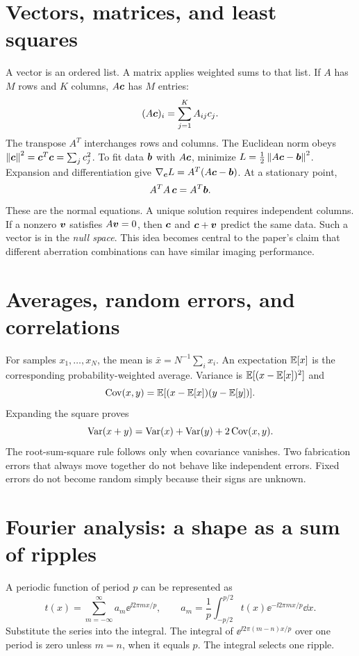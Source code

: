 \section{Vectors, matrices, and least squares}
A vector is an ordered list. A matrix applies weighted sums to that list.
If $A$ has $M$ rows and $K$ columns, $A\bm{c}$ has $M$ entries:
\[
(A\bm{c})_i=\sum_{j=1}^K A_{ij}c_j.
\]
The transpose $A^T$ interchanges rows and columns. The Euclidean norm
obeys $\left\lVert\bm{c}\right\rVert^2=\bm{c}^T\bm{c}=\sum_jc_j^2$.
To fit data $\bm{b}$ with $A\bm{c}$, minimize
$L=\tfrac12\left\lVert A\bm{c}-\bm{b}\right\rVert^2$.
Expansion and differentiation give
$\nabla_{\bm{c}}L=A^T(A\bm{c}-\bm{b})$.
At a stationary point,
\begin{equation}
A^TA\,\bm{c}=A^T\bm{b}.
\label{eq:normal}
\end{equation}
These are the normal equations. A unique solution requires independent
columns. If a nonzero $\bm{v}$ satisfies $A\bm{v}=0$, then $\bm{c}$
and $\bm{c}+\bm{v}$ predict the same data. Such a vector is in the
\emph{null space}. This idea becomes central to the paper's claim that
different aberration combinations can have similar imaging performance.

\section{Averages, random errors, and correlations}
For samples $x_1,\ldots,x_N$, the mean is $\bar x=N^{-1}\sum_i x_i$.
An expectation $\mathbb{E}[x]$ is the corresponding probability-weighted average.
Variance is $\mathbb{E}[(x-\mathbb{E}[x])^2]$ and
\[
\operatorname{Cov}(x,y)=\mathbb{E}[(x-\mathbb{E}[x])(y-\mathbb{E}[y])].
\]
Expanding the square proves
\begin{equation}
\operatorname{Var}(x+y)=\operatorname{Var}(x)+\operatorname{Var}(y)+2\operatorname{Cov}(x,y).
\label{eq:covsum}
\end{equation}
The root-sum-square rule follows only when covariance vanishes.
Two fabrication errors that always move together do not behave like
independent errors. Fixed errors do not become random simply because
their signs are unknown.

\section{Fourier analysis: a shape as a sum of ripples}
A periodic function of period $p$ can be represented as
\begin{equation}
t(x)=\sum_{m=-\infty}^{\infty}a_m\ee^{\ii2\pi mx/p},\qquad
a_m=\frac1p\int_{-p/2}^{p/2}t(x)\ee^{-\ii2\pi mx/p}\dd x.
\label{eq:fourierseries}
\end{equation}
Substitute the series into the integral. The integral of
$\ee^{\ii2\pi(m-n)x/p}$ over one period is zero unless $m=n$, when it
equals $p$. The integral selects one ripple.

